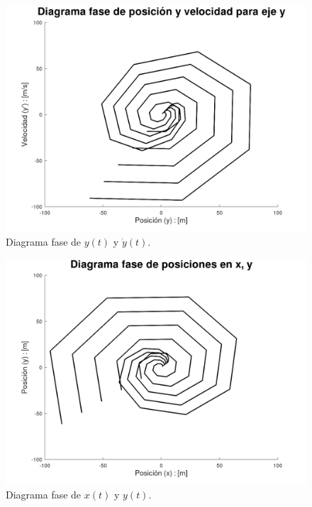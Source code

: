 \documentclass[12pt,letterpaper]{article}
\begin{document}
\begin{figure}
 \centering
 \includegraphics[scale=0.2]{img/fig11.png}
 \caption{Diagrama fase de $y(t)$ y $\dot{y}(t)$.}
\end{figure}

\begin{figure}
 \centering
 \includegraphics[scale=0.2]{img/fig12.png}
 \caption{Diagrama fase de $x(t)$ y $y(t)$.}
\end{figure}
\end{document}
